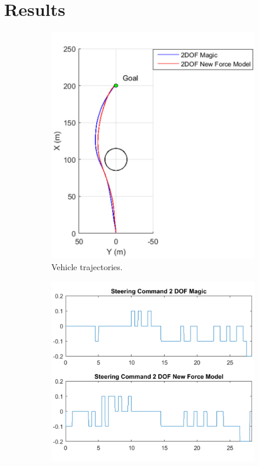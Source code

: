 \documentclass[12pt,onecolumn]{report}
\begin{document}
\section{Results}\label{s:Results2}

\begin{figure}
	\centering
	\begin{subfigure}[b]{0.49\columnwidth}
		\centering
		\includegraphics[height=\columnwidth]{Figs/Field1MagicvBekkerTrajectories_cropped.png}
		\caption{{\small Vehicle trajectories.}}   
		\label{fig:ObstacleField1TrajectoriesExp2}
	\end{subfigure}
	\hfill
	\begin{subfigure}[b]{0.49\columnwidth}
		\centering
		\includegraphics[width=\columnwidth]{Figs/Field1MagicvBekkerSteeringCommands_cropped.png}

\end{subfigure}
\end{figure}
\end{document}

